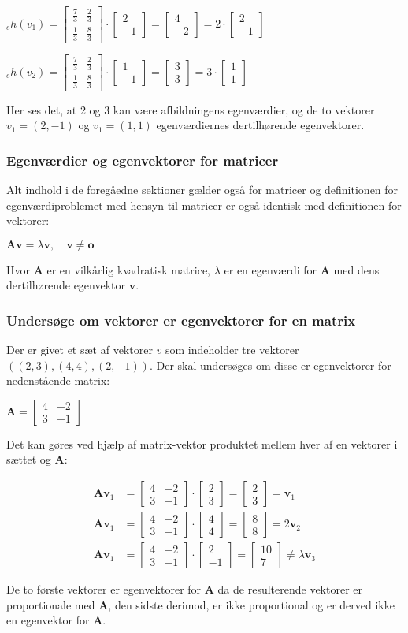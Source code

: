 \documentclass{article}
\newcommand{\cent}[1]{\begin{center}#1\end{center}}
\newcommand{\mAlign}[1]{\begin{align*}#1\end{align*}}
\newcommand{\vekt}[2]{\ensuremath{\begin{bmatrix} #1\\ #2\end{bmatrix}}}
\newcommand{\smallMatrix}[4]{\ensuremath{\begin{bmatrix}
			#1 & #2 \\
			#3 & #4
\end{bmatrix}}}
\begin{document}
	\cent{$ _eh(v_1)= \smallMatrix{\frac{7}{3}}{\frac{2}{3}}{\frac{1}{3}}{\frac{8}{3}} \cdot \vekt{2}{-1} = \vekt{4}{-2} = 2 \cdot \vekt{2}{-1}$}
	\cent{$ _eh(v_2)= \smallMatrix{\frac{7}{3}}{\frac{2}{3}}{\frac{1}{3}}{\frac{8}{3}} \cdot \vekt{1}{-1} = \vekt{3}{3} = 3 \cdot \vekt{1}{1}$}
	
	Her ses det, at 2 og 3 kan være afbildningens egenværdier, og de to vektorer $v_1=(2,-1)$ og $v_1=(1,1)$ egenværdiernes dertilhørende egenvektorer.
	
	\subsubsection{Egenværdier og egenvektorer for matricer}
	Alt indhold i de foregåedne sektioner gælder også for matricer og definitionen for egenværdiproblemet med hensyn til matricer er også identisk med definitionen for vektorer:
	
	\cent{$ \textbf{Av} = \lambda \textbf{v}, \quad \textbf{v} \neq \textbf{o} $}
	
	Hvor $ \textbf{A} $ er en vilkårlig kvadratisk matrice, $ \lambda $ er en egenværdi for $\textbf{A}$ med dens dertilhørende egenvektor $ \textbf{v} $.
	
	\subsubsection{Undersøge om vektorer er egenvektorer for en matrix}
	
	Der er givet et sæt af vektorer $ v $ som indeholder tre vektorer $ ((2,3),(4,4),(2,-1)) $. Der skal undersøges om disse er egenvektorer for nedenstående matrix:
	
	\cent{$ \textbf{A} = \smallMatrix{4}{-2}{3}{-1} $}
	
	Det kan gøres ved hjælp af matrix-vektor produktet mellem hver af en vektorer i sættet og $ \textbf{A} $:
	
	\mAlign{\textbf{A} \textbf{v}_1 &= \smallMatrix{4}{-2}{3}{-1} \cdot \vekt{2}{3} = \vekt{2}{3} = \textbf{v}_1 \\
		\textbf{A} \textbf{v}_1 &= \smallMatrix{4}{-2}{3}{-1} \cdot \vekt{4}{4} = \vekt{8}{8} = 2\textbf{v}_2 \\ 
		\textbf{A} \textbf{v}_1 &= \smallMatrix{4}{-2}{3}{-1} \cdot \vekt{2}{-1} = \vekt{10}{7} \neq \lambda \textbf{v}_3}
	
	De to første vektorer er egenvektorer for $ \textbf{A} $ da de resulterende vektorer er proportionale med $ \textbf{A} $, den sidste derimod, er ikke proportional og er derved ikke en egenvektor for $ \textbf{A} $.
	
\end{document}
